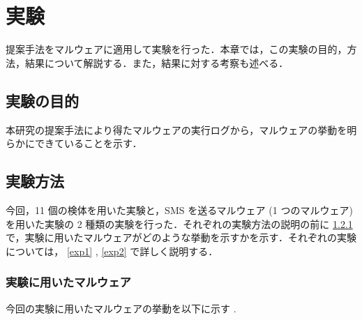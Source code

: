 \section{実験}
\label{sec:exp}
提案手法をマルウェアに適用して実験を行った．本章では，この実験の目的，方法，結果について解説する．また，結果に対する考察も述べる．
\subsection{実験の目的}
本研究の提案手法により得たマルウェアの実行ログから，マルウェアの挙動を明らかにできていることを示す．

\subsection{実験方法}
今回，11 個の検体を用いた実験と，SMS を送るマルウェア (1 つのマルウェア)を用いた実験の 2 種類の実験を行った．それぞれの実験方法の説明の前に \ref{expmalware} で，実験に用いたマルウェアがどのような挙動を示すかを示す．それぞれの実験については， \ref{exp1} , \ref{exp2} で詳しく説明する．

\subsubsection{実験に用いたマルウェア}
\label{expmalware}
今回の実験に用いたマルウェアの挙動を以下に示す \cite{golddream} \cite{basebridge} \cite{droiddreamlight} \cite{crazyapp} \cite{icalendar} \cite{snake} \cite{trojan} .

